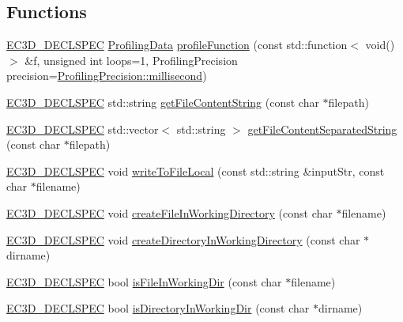 \subsection*{Functions}
\begin{DoxyCompactItemize}
\item 
\mbox{\hyperlink{_common_8h_aac42573e202ca3dd4d259c81691e2369}{E\+C3\+D\+\_\+\+D\+E\+C\+L\+S\+P\+EC}} \mbox{\hyperlink{structec_1_1_profiling_data}{Profiling\+Data}} \mbox{\hyperlink{namespaceec_a9cbcabe8cfdb73cc1b1bf12985d0bb49}{profile\+Function}} (const std\+::function$<$ void()$>$ \&f, unsigned int loops=1, Profiling\+Precision precision=\mbox{\hyperlink{_profiler_8h_ad14d98cdcfa4397ac3a0af6ce942c55d}{Profiling\+Precision\+::millisecond}})
\item 
\mbox{\hyperlink{_common_8h_aac42573e202ca3dd4d259c81691e2369}{E\+C3\+D\+\_\+\+D\+E\+C\+L\+S\+P\+EC}} std\+::string \mbox{\hyperlink{namespaceec_a8793889e569b903d70fe84e38980ab9c}{get\+File\+Content\+String}} (const char $\ast$filepath)
\item 
\mbox{\hyperlink{_common_8h_aac42573e202ca3dd4d259c81691e2369}{E\+C3\+D\+\_\+\+D\+E\+C\+L\+S\+P\+EC}} std\+::vector$<$ std\+::string $>$ \mbox{\hyperlink{namespaceec_a6f1328d81e3cafdc444b486b212994b8}{get\+File\+Content\+Separated\+String}} (const char $\ast$filepath)
\item 
\mbox{\hyperlink{_common_8h_aac42573e202ca3dd4d259c81691e2369}{E\+C3\+D\+\_\+\+D\+E\+C\+L\+S\+P\+EC}} void \mbox{\hyperlink{namespaceec_aaae259d9413b28eb2a234fccc4e63985}{write\+To\+File\+Local}} (const std\+::string \&input\+Str, const char $\ast$filename)
\item 
\mbox{\hyperlink{_common_8h_aac42573e202ca3dd4d259c81691e2369}{E\+C3\+D\+\_\+\+D\+E\+C\+L\+S\+P\+EC}} void \mbox{\hyperlink{namespaceec_a46156b1f66d440209a29046d0267923b}{create\+File\+In\+Working\+Directory}} (const char $\ast$filename)
\item 
\mbox{\hyperlink{_common_8h_aac42573e202ca3dd4d259c81691e2369}{E\+C3\+D\+\_\+\+D\+E\+C\+L\+S\+P\+EC}} void \mbox{\hyperlink{namespaceec_ae395ba21aba60fc9c2b339d7991c5454}{create\+Directory\+In\+Working\+Directory}} (const char $\ast$dirname)
\item 
\mbox{\hyperlink{_common_8h_aac42573e202ca3dd4d259c81691e2369}{E\+C3\+D\+\_\+\+D\+E\+C\+L\+S\+P\+EC}} bool \mbox{\hyperlink{namespaceec_a94eb2397937cb10b42f1f50cbba648d9}{is\+File\+In\+Working\+Dir}} (const char $\ast$filename)
\item 
\mbox{\hyperlink{_common_8h_aac42573e202ca3dd4d259c81691e2369}{E\+C3\+D\+\_\+\+D\+E\+C\+L\+S\+P\+EC}} bool \mbox{\hyperlink{namespaceec_a36d215dba638ca4f51f94404161d5367}{is\+Directory\+In\+Working\+Dir}} (const char $\ast$dirname)

\end{DoxyCompactItemize}

